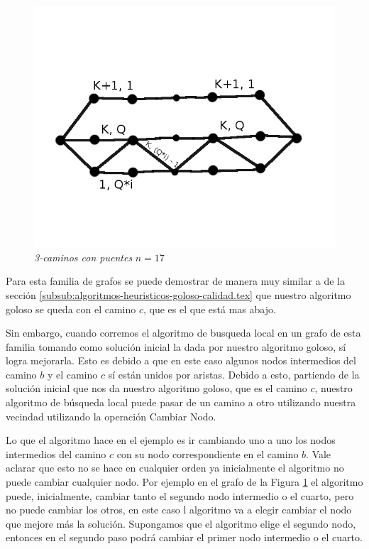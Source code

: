 \begin{figure}[H]
  \begin{center}
    \begin{minipage}{0.5\linewidth}
      \includegraphics[width=\linewidth]{graficos/grafoFamiliaRompe2.png}
      \caption{\emph{3-caminos con puentes} $n=17$}\label{fig:familia-rompe2}
    \end{minipage}
  \end{center}
\end{figure}

Para esta familia de grafos se puede demostrar de manera muy similar a de la sección \ref{subsub:algoritmos-heuristicos-goloso-calidad.tex} que nuestro algoritmo goloso se queda con el camino $c$, que es el que está mas abajo.

Sin embargo, cuando corremos el algoritmo de busqueda local en un grafo de esta familia tomando como solución inicial la dada por nuestro algoritmo goloso, sí logra mejorarla. Esto es debido a que en este caso algunos nodos intermedios del camino $b$ y el camino $c$ sí están unidos por aristas. Debido a esto, partiendo de la solución inicial que nos da nuestro algoritmo goloso, que es el camino $c$, nuestro algoritmo de búsqueda local puede pasar de un camino a otro utilizando nuestra vecindad utilizando la operación Cambiar Nodo.

Lo que el algoritmo hace en el ejemplo es ir cambiando uno a uno los nodos intermedios del camino $c$ con su nodo correspondiente en el camino $b$. Vale aclarar que esto no se hace en cualquier orden ya inicialmente el algoritmo no puede cambiar cualquier nodo. Por ejemplo en el grafo de la Figura \ref{fig:familia-rompe2} el algoritmo puede, inicialmente, cambiar tanto el segundo nodo intermedio o el cuarto, pero no puede cambiar los otros, en este caso l algoritmo va a elegir cambiar el nodo que mejore más la solución. Supongamos que el algoritmo elige el segundo nodo, entonces en el segundo paso podrá cambiar el primer nodo intermedio o el cuarto.
